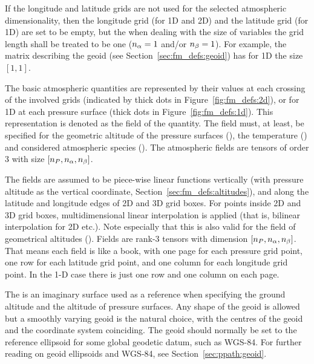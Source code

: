 If the longitude and latitude grids are not used for the selected
atmospheric dimensionality, then the longitude grid (for 1D and 2D)
and the latitude grid (for 1D) are set to be empty, but the when
dealing with the size of variables the grid length shall be treated to
be one ($n_{\alpha}=1$ and/or $n_{\beta}=1$). For example,
the matrix describing the geoid (see Section~\ref{sec:fm_defs:geoid})
has for 1D the size $[1,1]$.

The basic atmospheric quantities are represented by their values at
each crossing of the involved grids (indicated by thick dots in
Figure~\ref{fig:fm_defs:2d}), or for 1D at each pressure surface
(thick dots in Figure~\ref{fig:fm_defs:1d}). This representation is
denoted as the field of the quantity. The
field must, at least, be specified for the geometric altitude of the
pressure surfaces (), the temperature ()
and considered atmospheric species (). The atmospheric
fields are tensors of order 3 with size
$[n_{P},n_{\alpha},n_{\beta}]$.

The fields are assumed to be piece-wise linear functions vertically
(with pressure altitude as the vertical coordinate,
Section~\ref{sec:fm_defs:altitudes}), and along the latitude and
longitude edges of 2D and 3D grid boxes. For points inside 2D and 3D
grid boxes, multidimensional linear interpolation is applied (that is,
bilinear interpolation for 2D etc.). Note especially that this is also
valid for the field of geometrical altitudes ().
Fields are rank-3 tensors with dimension
$[n_{P},n_{\alpha},n_{\beta}]$.  That means each
field is like a book, with one page for each pressure grid point, one
row for each latitude grid point, and one column for each longitude
grid point. In the 1-D case there is just one row and one column on
each page.



\label{sec:fm_defs:geoid}

The  is an imaginary surface used as a
reference when specifying the ground altitude and the altitude
of pressure surfaces. Any shape of the geoid is allowed but a smoothly
varying geoid is the natural choice, with the centres of the geoid and
the coordinate system coinciding. The geoid should normally be set to
the reference ellipsoid for some global geodetic datum, such as
WGS-84. For further reading on geoid ellipsoids and WGS-84, see
Section~\ref{sec:ppath:geoid}.


